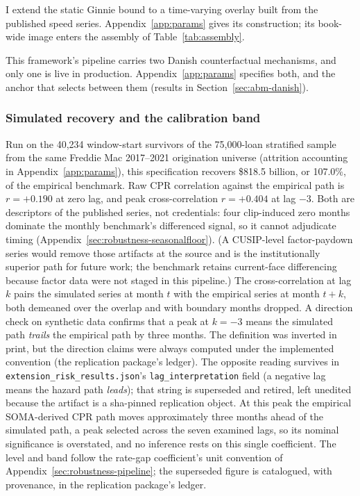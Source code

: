 \documentclass[12pt]{article}
\begin{document}
I extend the static Ginnie bound to a time-varying overlay built from the published speed series. Appendix~\ref{app:params} gives its construction; its book-wide image enters the assembly of Table~\ref{tab:assembly}.

This framework's pipeline carries two Danish counterfactual mechanisms, and only one is live in production. Appendix~\ref{app:params} specifies both, and the anchor that selects between them (results in Section~\ref{sec:abm-danish}).

\subsubsection{Simulated recovery and the calibration band}

Run on the 40,234 window-start survivors of the 75,000-loan stratified sample from the same Freddie Mac 2017--2021 origination universe (attrition accounting in Appendix~\ref{app:params}), this specification recovers \$818.5 billion, or 107.0\%, of the empirical benchmark. Raw CPR correlation against the empirical path is $r = +0.190$ at zero lag, and peak cross-correlation $r = +0.404$ at lag $-3$. Both are descriptors of the published series, not credentials: four clip-induced zero months dominate the monthly benchmark's differenced signal, so it cannot adjudicate timing (Appendix~\ref{sec:robustness-seasonalfloor}). (A CUSIP-level factor-paydown series would remove those artifacts at the source and is the institutionally superior path for future work; the benchmark retains current-face differencing because factor data were not staged in this pipeline.) The cross-correlation at lag $k$ pairs the simulated series at month $t$ with the empirical series at month $t+k$, both demeaned over the overlap and with boundary months dropped. A direction check on synthetic data confirms that a peak at $k=-3$ means the simulated path \emph{trails} the empirical path by three months. The definition was inverted in print, but the direction claims were always computed under the implemented convention (the replication package's ledger). The opposite reading survives in \texttt{extension\_risk\_results.json}'s \texttt{lag\_interpretation} field (a negative lag means the hazard path \emph{leads}); that string is superseded and retired, left unedited because the artifact is a sha-pinned replication object. At this peak the empirical SOMA-derived CPR path moves approximately three months ahead of the simulated path, a peak selected across the seven examined lags, so its nominal significance is overstated, and no inference rests on this single coefficient. The level and band follow the rate-gap coefficient's unit convention of Appendix~\ref{sec:robustness-pipeline}; the superseded figure is catalogued, with provenance, in the replication package's ledger.
\end{document}
